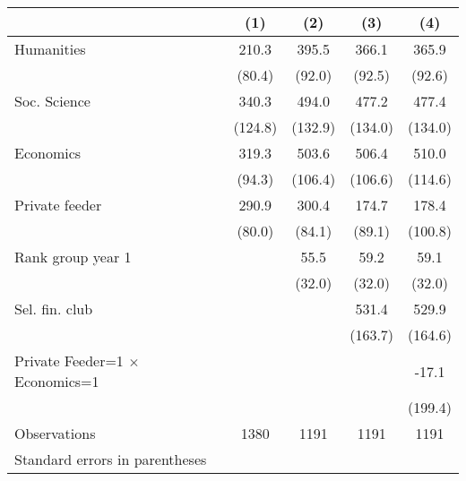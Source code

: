 \begin{tabular}{l*{4}{c}}
\toprule
                    &\multicolumn{1}{c}{(1)}&\multicolumn{1}{c}{(2)}&\multicolumn{1}{c}{(3)}&\multicolumn{1}{c}{(4)}\\
\midrule
Humanities          &       210.3&       395.5&       366.1&       365.9\\
                    &      (80.4)&      (92.0)&      (92.5)&      (92.6)\\
\addlinespace
Soc. Science        &       340.3&       494.0&       477.2&       477.4\\
                    &     (124.8)&     (132.9)&     (134.0)&     (134.0)\\
\addlinespace
Economics           &       319.3&       503.6&       506.4&       510.0\\
                    &      (94.3)&     (106.4)&     (106.6)&     (114.6)\\
\addlinespace
Private feeder      &       290.9&       300.4&       174.7&       178.4\\
                    &      (80.0)&      (84.1)&      (89.1)&     (100.8)\\
\addlinespace
Rank group year 1   &            &        55.5&        59.2&        59.1\\
                    &            &      (32.0)&      (32.0)&      (32.0)\\
\addlinespace
Sel. fin. club      &            &            &       531.4&       529.9\\
                    &            &            &     (163.7)&     (164.6)\\
\addlinespace
Private Feeder=1 $\times$ Economics=1&            &            &            &       -17.1\\
                    &            &            &            &     (199.4)\\
\midrule
Observations        &        1380&        1191&        1191&        1191\\
\bottomrule
\multicolumn{5}{l}{\footnotesize Standard errors in parentheses}\\
\end{tabular}
